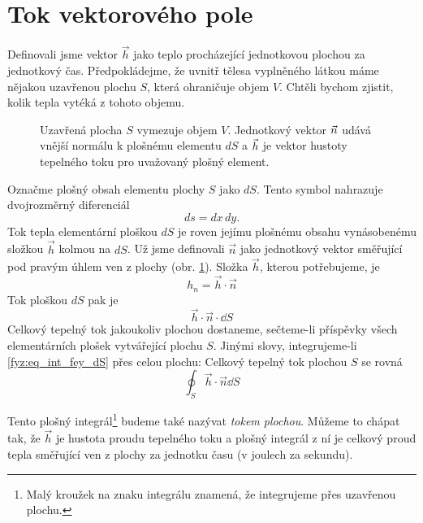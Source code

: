 {  %
  \section{Tok vektorového pole}
    Definovali jsme vektor $\vec{h}$ jako teplo procházející jednotkovou plochou za jednotkový čas.
    Předpokládejme, že uvnitř tělesa vyplněného látkou máme nějakou uzavřenou plochu \(S\), která 
    ohraničuje objem \(V\). Chtěli bychom zjistit, kolik tepla vytéká z tohoto objemu.

    \begin{figure}[ht!]  %
      \centering
      
      \caption{Uzavřená plocha $S$ vymezuje objem $V$. Jednotkový vektor $\protect\vec{n}$ udává 
        vnější normálu k plošnému elementu $dS$ a $\protect\vec{h}$ je vektor hustoty 
        tepelného toku pro uvažovaný plošný element.}
      \label{fyz:fig034}
    \end{figure}
    Označme plošný obsah elementu plochy \(S\) jako \(dS\). Tento symbol nahrazuje dvojrozměrný
    diferenciál
    \begin{equation}
      ds=dx\,dy.
    \end{equation}
    Tok tepla elementární ploškou \(dS\) je roven jejímu plošnému obsahu  vynásobenému složkou 
    $\vec{h}$ kolmou na \(dS\). Už jsme definovali $\vec{n}$ jako jednotkový vektor směřující pod 
    pravým úhlem ven z plochy (obr. \ref{fyz:fig034}). Složka $\vec{h}$, kterou potřebujeme, je
    \begin{equation}
      h_n = \vec{h}\cdot\vec{n}
    \end{equation}
    Tok ploškou $dS$ pak je
    \begin{equation}\label{fyz:eq_int_fey_dS}
      \vec{h}\cdot\vec{n}\cdot\dd{S}
    \end{equation}
    Celkový tepelný tok jakoukoliv plochou dostaneme, sečteme-li příspěvky všech elementárních 
    plošek vytvářející plochu \(S\). Jinými slovy, integrujeme-li \ref{fyz:eq_int_fey_dS} přes 
    celou plochu: Celkový tepelný tok plochou \(S\) se rovná
    \begin{equation}
      \oint_S\vec{h}\cdot\vec{n}\dd{S}
    \end{equation}

    Tento plošný integrál\footnote{Malý kroužek na znaku integrálu znamená, že integrujeme přes 
    uzavřenou plochu.} budeme také nazývat \emph{tokem plochou}. Můžeme to chápat tak, že $\vec{h}$ 
    je hustota proudu tepelného toku a plošný integrál z ní je celkový proud tepla směřující ven z 
    plochy za jednotku času (v joulech za sekundu).
    
}
